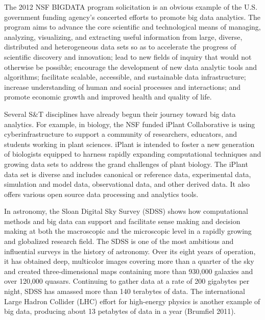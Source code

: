 The 2012 NSF BIGDATA program solicitation is an obvious
example of the U.S. government funding agency’s concerted
efforts to promote big data analytics. The program
aims to advance the core scientific and technological
means of managing, analyzing, visualizing, and extracting
useful information from large, diverse, distributed
and heterogeneous data sets so as to accelerate
the progress of scientific discovery and innovation;
lead to new fields of inquiry that would not
otherwise be possible; encourage the development of
new data analytic tools and algorithms; facilitate
scalable, accessible, and sustainable data infrastructure;
increase understanding of human and social
processes and interactions; and promote economic
growth and improved health and quality of life.

Several S\&T disciplines have already begun their journey
toward big data analytics. For example, in biology, the NSF
funded iPlant Collaborative is using cyberinfrastructure to
support a community of researchers, educators, and students
working in plant sciences. iPlant is intended to foster a new
generation of biologists equipped to harness rapidly expanding
computational techniques and growing data sets to
address the grand challenges of plant biology. The iPlant data
set is diverse and includes canonical or reference data,
experimental data, simulation and model data, observational
data, and other derived data. It also offers various open
source data processing and analytics tools.

In astronomy, the Sloan Digital Sky Survey (SDSS) shows
how computational methods and big data can support and
facilitate sense making and decision making at both the
macroscopic and the microscopic level in a rapidly growing
and globalized research field. The SDSS is one of the most
ambitious and influential surveys in the history of astronomy.
Over its eight years of operation, it has obtained deep, multicolor
images covering more than a quarter of the sky and
created three-dimensional maps containing more than 930,000
galaxies and over 120,000 quasars. Continuing to gather data
at a rate of 200 gigabytes per night, SDSS has amassed more
than 140 terabytes of data. The international Large Hadron
Collider (LHC) effort for high-energy physics is another
example of big data, producing about 13 petabytes of data in
a year (Brumfiel 2011).

